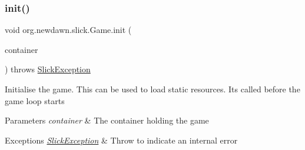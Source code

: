 \mbox{\label{interfaceorg_1_1newdawn_1_1slick_1_1_game_ad2dd6affab08bb8fdb5fab0815957b7a}} 
\subsubsection{\texorpdfstring{init()}{init()}}
{\footnotesize\ttfamily void org.\+newdawn.\+slick.\+Game.\+init (\begin{DoxyParamCaption}\item[{\mbox{\hyperlink{classorg_1_1newdawn_1_1slick_1_1_game_container}{Game\+Container}}}]{container }\end{DoxyParamCaption}) throws \mbox{\hyperlink{classorg_1_1newdawn_1_1slick_1_1_slick_exception}{Slick\+Exception}}}

Initialise the game. This can be used to load static resources. It\textquotesingle{}s called before the game loop starts


\begin{DoxyParams}{Parameters}
{\em container} & The container holding the game \\
\hline
\end{DoxyParams}

\begin{DoxyExceptions}{Exceptions}
{\em \mbox{\hyperlink{classorg_1_1newdawn_1_1slick_1_1_slick_exception}{Slick\+Exception}}} & Throw to indicate an internal error \\
\hline
\end{DoxyExceptions}


